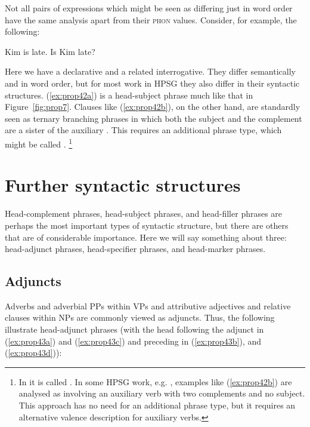 \documentclass[output=paper
	        ,collection
	        ,collectionchapter
 	        ,biblatex
                ,babelshorthands
                ,newtxmath
                ,draftmode
                ,colorlinks, citecolor=brown
]{langscibook}
\begin{document}
Not all pairs of expressions which might be seen as differing just in word order have the same analysis apart from their \textsc{phon} values. Consider, for example, the following:

\eal\label{ex:prop42}
\ex\label{ex:prop42a}
Kim is late.
\ex\label{ex:prop42b}
Is Kim late?
\zl

Here we have a declarative and a related interrogative. They differ semantically and in word order, but for most work in HPSG they also differ in their syntactic structures. (\ref{ex:prop42a}) is a head-subject phrase much like that in Figure~\ref{fig:prop7}. Clauses like (\ref{ex:prop42b}), on the other hand, are standardly seen as ternary branching phrases in which both the subject and the complement are a sister of the auxiliary \citep[40]{ps2}. This requires an additional phrase type, which might be called .%
%
\footnote{In \citet[36]{GSag2000a-u} it is called . In some HPSG work, e.g. \citet[409--414]{SWB2003a}, examples like (\ref{ex:prop42b}) are analysed as involving an auxiliary verb with two complements and no subject. This approach has no need for an additional phrase type, but it requires an alternative valence description for auxiliary verbs.}
%


\section{Further syntactic structures}\label{sec:prop6}
\label{prop:sec-further-syntactic-structures}

Head-complement phrases, head-subject phrases, and head-filler phrases are perhaps the most important types of syntactic structure, but there are others that are of considerable importance. Here we will say something about three: head-adjunct phrases, head-specifier phrases, and head-marker phrases.

\subsection{Adjuncts}\label{sec:prop6.1}

Adverbs and adverbial PPs within VPs and attributive adjectives and relative clauses within NPs are commonly viewed as adjuncts. Thus, the following illustrate head-adjunct phrases (with the head following the adjunct in (\ref{ex:prop43a}) and (\ref{ex:prop43c}) and preceding in (\ref{ex:prop43b}), and (\ref{ex:prop43d})):
\end{document}
